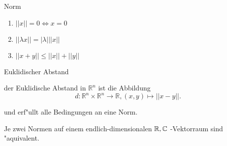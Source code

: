 \documentclass[class=article, crop=false]{standalone}
\begin{document}
\begin{zettel}{Norm}

\begin{flashcard}
    \begin{definition}[Norm]
    \begin{enumerate}
        \item $ ||x|| = 0 \iff x = 0$ 
        \item $ ||\lambda x|| = |\lambda| ||x||$ 
        \item $ ||x + y|| \leq  ||x|| + ||y||$
    \end{enumerate}
    \end{definition}
\end{flashcard}

\begin{flashcard}
\begin{question}
Euklidischer Abstand
\end{question}
    \begin{definition}
        der Euklidische Abstand in $\mathbb{R}^n $ ist die Abbildung
        \[
            d: \mathbb{R}^n \times \mathbb{R}^n \longrightarrow  \mathbb{R}, (x,y) \mapsto ||x-y||
        .\]
    \end{definition}
    und erf"ullt alle Bedingungen an eine Norm.
\end{flashcard}

\begin{theorem}
    Je zwei Normen auf einem endlich-dimensionalen $\mathbb{R},\mathbb{C} $ -Vektorraum sind "aquivalent.
\end{theorem}

\end{zettel}
\end{document}
